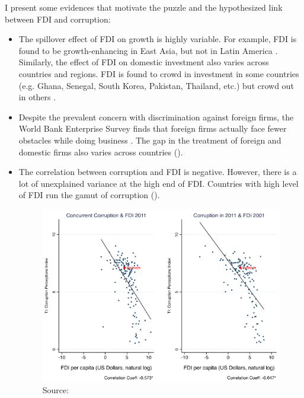 I present some evidences that motivate the puzzle and the hypothesized link between FDI and corruption:

\begin{itemize}
	\item The spillover effect of FDI on growth is highly variable. For example, FDI is found to be growth-enhancing in East Asia, but not in Latin America \citep{Zhang2001}. Similarly, the effect of FDI on domestic investment also varies across countries and regions. FDI is found to crowd in investment in some countries (e.g. Ghana, Senegal, South Korea, Pakistan, Thailand, etc.) but crowd out in others \citep{Agosin2005}.
	
	\item Despite the prevalent concern with discrimination against foreign firms, the World Bank Enterprise Survey finds that foreign firms actually face fewer obstacles while doing business \citep{Batra2003}. The gap in the treatment of foreign and domestic firms also varies across countries ().
	
	\item The correlation between corruption and FDI is negative. However, there is a lot of unexplained variance at the high end of FDI. Countries with high level of FDI run the gamut of corruption ().
	
	\begin{figure}[!ht]
	\includegraphics[width=\textwidth, height=\textheight,keepaspectratio]{../figure/fdi_corruption}
	\caption{Source: \citep{Malesky2015}}
	\label{fig:fdi_corruption}
	\end{figure}
\end{itemize}
